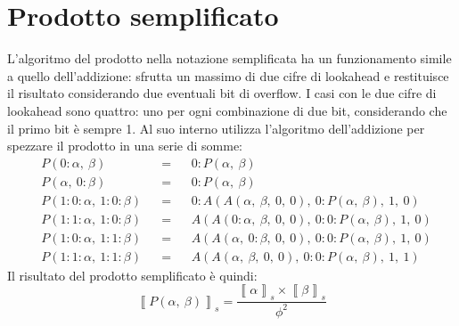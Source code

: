 \documentclass[Lau]{sapthesis}
\begin{document}
\section{Prodotto semplificato}
L'algoritmo del prodotto nella notazione semplificata ha un funzionamento simile a quello dell'addizione: sfrutta un massimo di due cifre di lookahead e restituisce il risultato considerando due eventuali bit di overflow. I casi con le due cifre di lookahead sono quattro: uno per ogni combinazione di due bit, considerando che il primo bit è sempre 1. Al suo interno utilizza l'algoritmo dell'addizione per spezzare il prodotto in una serie di somme:
\begin{align*}
&P(0:\alpha, \ \beta) && = && 0:P(\alpha, \ \beta)\\
&P(\alpha, \ 0:\beta) && = && 0:P(\alpha, \ \beta)\\
&P(1:0:\alpha, \ 1:0:\beta) && = && 0:A(A(\alpha, \ \beta, \ 0, \ 0), \ 0:P(\alpha, \ \beta), \ 1, \ 0)\\
&P(1:1:\alpha, \ 1:0:\beta) && = && A(A(0:\alpha, \ \beta, \ 0, \ 0), \ 0:0:P(\alpha, \ \beta), \ 1, \ 0)\\
&P(1:0:\alpha, \ 1:1:\beta) && = && A(A(\alpha, \ 0:\beta, \ 0, \ 0), \ 0:0:P(\alpha, \ \beta), \ 1, \ 0)\\
&P(1:1:\alpha, \ 1:1:\beta) && = && A(A(\alpha, \ \beta, \ 0, \ 0), \ 0:0:P(\alpha, \ \beta), \ 1, \ 1)
\end{align*}
Il risultato del prodotto semplificato è quindi:
$$\left\llbracket P(\alpha, \ \beta) \right\rrbracket_s = \frac{\left\llbracket \alpha \right\rrbracket_s \times \left\llbracket \beta \right\rrbracket_s}{\phi^2}$$
\end{document}
